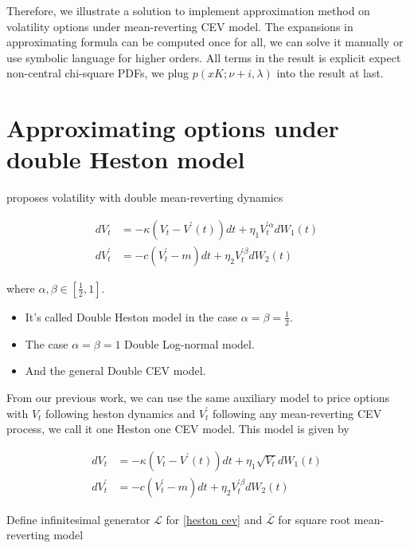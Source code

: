 Therefore, we illustrate a solution to implement approximation method on volatility options under mean-reverting CEV model. The expansions in approximating formula can be computed once for all, we can solve it manually or use symbolic language for higher orders. All terms in the result is explicit expect non-central chi-square PDFs, we plug $p(xK;\nu+i,\lambda)$ into the result at last.

\section{Approximating options under double Heston model}

\cite{gatheral_consistent_nodate} proposes volatility with double mean-reverting dynamics

$$
    \begin{aligned}
        d V_t &=-\kappa\left(V_t-V^{\prime}(t)\right) d t+\eta_{1} V^{\prime \alpha}_t  d W_1(t) \\
        d V^{\prime}_t &=-c\left(V^{\prime}_t-m\right) d t+\eta_{2} V^{\prime \beta}_t d W_{2}(t)
    \end{aligned}
$$

\noindent where $\alpha, \beta \in [\frac{1}{2},1]$.

\begin{itemize}
    \item It's called Double Heston model in the case $\alpha=\beta=\frac{1}{2}$.
    \item The case $\alpha=\beta=1$ Double Log-normal model.
    \item And the general Double CEV model.
\end{itemize}

From our previous work, we can use the same auxiliary model to price options with $V_t$ following heston dynamics and $V^{\prime}_t$ following any mean-reverting CEV process, we call it one Heston one CEV model. This model is given by

\begin{equation}\label{heston cev}
    \begin{aligned}
        d V_t &=-\kappa\left(V_t-V^{\prime}(t)\right) d t+\eta_{1} \sqrt{V_t} d W_1(t) \\
        d V^{\prime}_t &=-c\left(V^{\prime}_t-m\right) d t+\eta_{2} V^{\prime \beta}_t d W_{2}(t)
    \end{aligned}
\end{equation}

Define infinitesimal generator $\mathcal{L}$ for \eqref{heston cev} and $\bar{\mathcal{L}}$ for square root mean-reverting model


